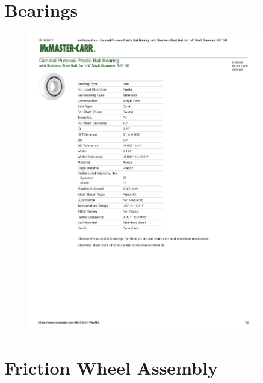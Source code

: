 \documentclass[../main.tex]{subfiles}
\begin{document}
\section{Bearings \cite{PBearings}} \label{PBearings}
\begin{figure}[H]
	\centering
	\includegraphics[width=0.9\textwidth]{img/specs//Bearing-Specs.pdf}
\end{figure}

\section{Friction Wheel Assembly}

\end{document}
